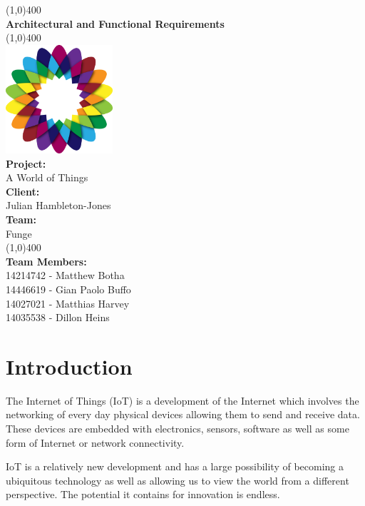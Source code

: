 \documentclass{article}
\begin{document}
\begin{titlepage}
	\begin{center}
		\line(1,0){400}\\
		[6mm]
		\huge{\bfseries Architectural and Functional Requirements}\\
		\line(1,0){400}\\
			[5mm]
			\includegraphics[width=150px]{images/AWorldOfPlants.png}
			\\
		[5mm]
		\large\textbf{Project:}\\A World of Things\\
		[3mm]
		\large\textbf{Client:}\\Julian Hambleton-Jones\\
		[3mm]
		\large \textbf{Team:}\\Funge\\
		\line(1,0){400}\\
		[5mm]
		\large \textbf{Team Members:}\\
		[3mm]
		\large 14214742 - Matthew Botha\\
		\large 14446619 - Gian Paolo Buffo\\
		\large 14027021 - Matthias Harvey\\
        \large 14035538 - Dillon Heins\\[3mm]
	\end{center}
\end{titlepage}

\cleardoublepage
\thispagestyle{empty}
\tableofcontents
\cleardoublepage
\setcounter{page}{1}

\section{Introduction}
	The Internet of Things (IoT) is a development of the Internet which involves the networking of every day physical devices allowing them to send and receive data. These devices are embedded with electronics, sensors, software as well as some form of Internet or network connectivity.


	IoT is a relatively new development and has a large possibility of becoming a ubiquitous technology as well as allowing us to view the world from a different perspective. The potential it contains for innovation is endless.
\end{document}

